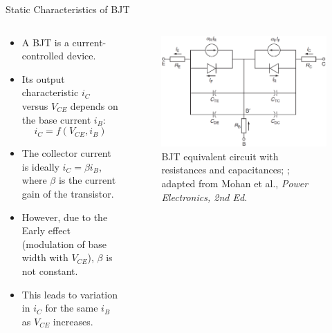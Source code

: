 \begin{frame}{Static Characteristics of BJT}
    \begin{columns}
    \begin{column}{0.55\textwidth}
    \begin{itemize}
        \item A BJT is a current-controlled device.
        \item Its output characteristic $i_C$ versus $V_{CE}$ depends on the base current $i_B$:
        \[
            i_C = f(V_{CE}, i_B)
        \]
        \item The collector current is ideally $i_C = \beta i_B$, where $\beta$ is the current gain of the transistor.
        \item However, due to the Early effect (modulation of base width with $V_{CE}$), $\beta$ is not constant.
        \item This leads to variation in $i_C$ for the same $i_B$ as $V_{CE}$ increases.
    \end{itemize}
    \end{column}

    \begin{column}{0.45\textwidth}
    \begin{figure}
        \centering
        \includegraphics[width=1\textwidth]{fig/lec04/BJT_eq_circuit.png}
        \caption{BJT equivalent circuit with resistances and capacitances; ; adapted from Mohan et al., \textit{Power Electronics, 2nd Ed.}}
    \end{figure}
    \end{column}
\end{columns}
\end{frame}


